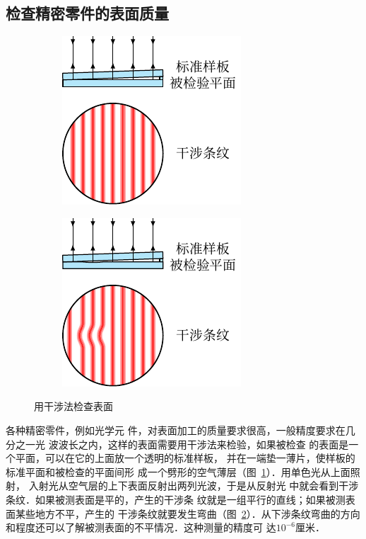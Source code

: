 \subsection{检查精密零件的表面质量}
\begin{figure}[htbp]
    \centering
    \begin{subfigure}{0.4\linewidth}
        \centering
        \includegraphics{fig/C/6-5a.pdf}
        \caption{}\label{fig_C_6-5a}
    \end{subfigure}
    \hfil
    \begin{subfigure}{0.4\linewidth}
        \centering
        \includegraphics{fig/C/6-5b.pdf}
        \caption{}\label{fig_C_6-5b}
    \end{subfigure}
    \caption{用干涉法检查表面}\label{fig_C_6-5}
\end{figure}

各种精密零件，例如光学元
件，对表面加工的质量要求很高，一般精度要求在几分之一光
波波长之内，这样的表面需要用干涉法来检验，如果被检查
的表面是一个平面，可以在它的上面放一个透明的标准样板，
并在一端垫一薄片，使样板的标准平面和被检查的平面间形
成一个劈形的空气薄层（图~\ref{fig_C_6-5a}）．用单色光从上面照射，
入射光从空气层的上下表面反射出两列光波，于是从反射光
中就会看到干涉条纹．如果被测表面是平的，产生的干涉条
纹就是一组平行的直线；如果被测表面某些地方不平，产生的
干涉条纹就要发生弯曲（图~\ref{fig_C_6-5b}）．从下涉条纹弯曲的方向
和程度还可以了解被测表面的不平情况．这种测量的精度可
达$10^{-6}$厘米．


